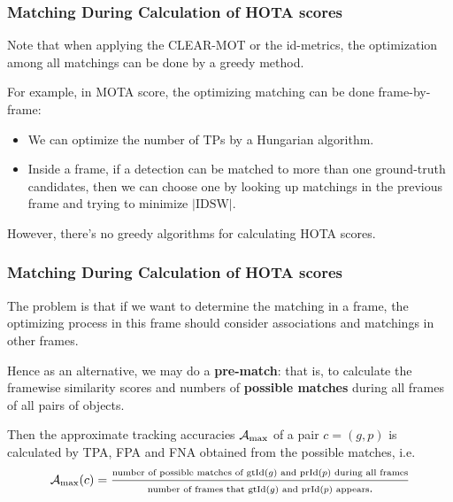 \documentclass[slidetop, mathserif, dvipsnames]{beamer}
\begin{document}
\begin{frame}
	\frametitle{Matching During Calculation of HOTA scores}

	Note that when applying the CLEAR-MOT or the id-metrics,
	the optimization among all matchings can be done by a greedy method.

	\vspace{5pt}

	For example, in MOTA score, the optimizing matching can be done
	frame-by-frame:
	\begin{itemize}
	\item We can optimize the number of TPs by a Hungarian algorithm.
	\item Inside a frame, if a detection can be matched to more than one
		ground-truth candidates, then we can choose one by looking up
		matchings in the previous frame and trying to minimize $|\text{IDSW}|$.
	\end{itemize}

	However, there's no greedy algorithms for calculating HOTA scores.
	
\end{frame}

\begin{frame}
	\frametitle{Matching During Calculation of HOTA scores}

	The problem is that if we want to determine the matching in a frame,
	the optimizing process in this frame should consider associations and matchings in other frames.

	\vspace{5pt}

	Hence as an alternative, we may do a {\bf pre-match}: that is, to calculate
	the framewise similarity scores and numbers of {\bf possible matches}
	during all frames of all pairs of objects.

	\vspace{5pt}

	Then the approximate tracking accuracies $\mathcal A_{\rm max}$
	of a pair $c=(g,p)$ is calculated by TPA, FPA and FNA obtained from
	the possible matches, i.e.
	\[
		\mathcal A_{\rm max}(c) = 
		\dfrac{\scriptsize\text{number of possible matches of gtId($g$) and prId($p$) during all frames}}{
			\text{\scriptsize number of frames that gtId($g$) and prId($p$) appears}.
		}
	\]

\end{frame}


\end{document}
